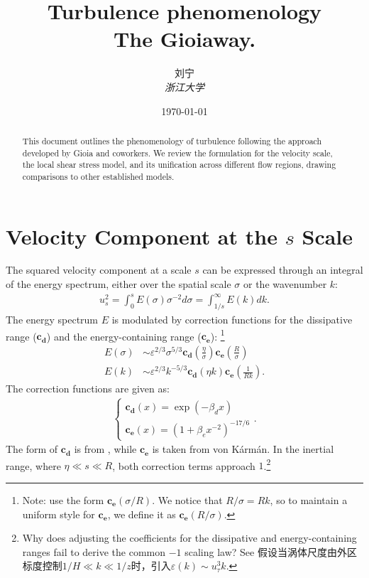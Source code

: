 \documentclass[10pt]{article}
\title{Turbulence phenomenology \\ \large The Gioia\his way.}
\author{刘宁 \\ \textit{浙江大学}} %
\date{\today}
\begin{document}
\maketitle

\begin{abstract}
This document outlines the phenomenology of turbulence following the approach developed by Gioia and coworkers. We review the formulation for the velocity scale, the local shear stress model, and its unification across different flow regions, drawing comparisons to other established models.
\end{abstract}


\section{Velocity Component at the $s$ Scale}

The squared velocity component at a scale $s$ can be expressed through an integral of the energy spectrum, either over the spatial scale $\sigma$ or the wavenumber $k$:
\begin{align*}
    u_s^2 = \int_0^s E(\sigma) \sigma^{-2} d\sigma = \int_{1 / s}^{\infty} E(k) dk
.\end{align*}
The energy spectrum $E$ is modulated by correction functions for the dissipative range ($\mathbf{c_d}$) and the energy-containing range ($\mathbf{c_e}$): \footnote{Note: \citet{gioiaFriction2006} use the form $\mathbf{c_e} \left( \sigma / R \right) $. We notice that $R / \sigma = Rk$, so to maintain a uniform style for $\mathbf{c_e} $, we define it as $\mathbf{c_e} \left( R / \sigma \right) $.}
\begin{align*}
    E(\sigma) &\sim \varepsilon^{2 / 3} \sigma^{5 / 3} \mathbf{c_d} \left( \frac{\eta}{\sigma} \right) \mathbf{c_e} \left( \frac{R}{\sigma} \right) \\
    E(k) &\sim \varepsilon^{2 / 3} k^{-5 / 3} \mathbf{c_d} (\eta k) \mathbf{c_e} \left( \frac{1}{Rk} \right).
\end{align*}
The correction functions are given as:
\begin{align*}
    \begin{cases}
        \mathbf{c_d}\left( x \right)  = \exp\left( -\beta_d x \right) \\
        \mathbf{c_e} \left( x \right) = \left( 1+\beta_e x^{-2} \right) ^{-17 / 6} 
    \end{cases}
.\end{align*}
The form of $\mathbf{c_d}$ is from \citet{gioiaFriction2006}, while $\mathbf{c_e}$ is taken from von Kármán. In the inertial range, where $\eta \ll s \ll R$, both correction terms approach $1$.\footnote{Why does adjusting the coefficients for the dissipative and energy-containing ranges fail to derive the common $-1$ scaling law? See \cite{nikora1999prl} 假设当涡体尺度由外区标度控制$1 / H \ll k \ll 1 / z$时，引入$\varepsilon(k) \sim u_{\tau }^3 k$.}
\end{document}
